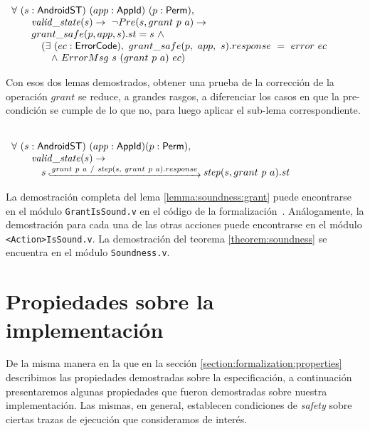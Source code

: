 \begin{lemma}
     \mbox{} \\
    $ \begin{array}[t]{l} \forall\ (s:\AndroidState)\ (app:\AppId)\ (p:\Perm),
            \\
            \quad \quad \ap{valid\_state}{s} \rightarrow\ \neg Pre(s, grant\ p\ a) \rightarrow
            \\
            \quad \quad grant\_safe(p, app, s).st = s\ \land
            \\
            \quad \quad \quad (\exists\ (ec: \ErrorCode),\ grant\_safe(p,\ app,\ s).response\ =\
            error\ ec \\
            \quad \quad \quad \quad \land\ ErrorMsg\ s\ (grant\ p\ a)\ ec)
            \\
        \end{array} $
\end{lemma}

Con esos dos lemas demostrados, obtener una prueba de la corrección de la operación $grant$ se
reduce, a grandes rasgos, a diferenciar los casos en que la pre-condición se cumple de lo que no,
para luego aplicar el sub-lema correspondiente.

\begin{lemma}
     \label{lemma:soundness:grant} \mbox{} \\
    $ \begin{array}[t]{l} \forall\ (s:\AndroidState)\ (app:\AppId) (p:\Perm),
            \\
            \quad \quad \ap{valid\_state}{s} \rightarrow\
            \\
            \quad \quad \quad s\step{grant\ p\ a\ /\ step(s,\ grant\ p\ a).response}
            \bap{step}{s}{grant\ p\ a}.st \\
        \end{array} $
\end{lemma}

La demostración completa del lema \ref{lemma:soundness:grant} puede encontrarse en el módulo
\texttt{GrantIsSound.v} en el código de la formalización~\cite{github-code}. Análogamente, la
demostración para cada una de las otras acciones puede encontrarse en el módulo
\texttt{<Action>IsSound.v}. La demostración del teorema \ref{theorem:soundness} se encuentra en el
módulo \texttt{Soundness.v}.

\section{Propiedades sobre la implementación}
De la misma manera en la que en la sección \ref{section:formalization:properties} describimos las
propiedades demostradas sobre la especificación, a continuación presentaremos algunas propiedades
que fueron demostradas sobre nuestra implementación. Las mismas, en general, establecen condiciones
de \textit{safety} sobre ciertas trazas de ejecución que consideramos de interés.

